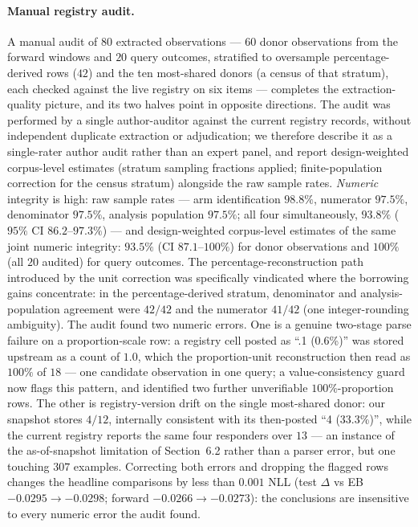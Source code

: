 \documentclass[11pt]{article}
\begin{document}
\paragraph{Manual registry audit.} A manual audit of $80$ extracted
observations --- $60$ donor observations from the forward windows and $20$
query outcomes, stratified to oversample percentage-derived rows ($42$) and
the ten most-shared donors (a census of that stratum), each checked against
the live registry on six
items --- completes the extraction-quality picture, and its two halves point
in opposite directions. The audit was performed by a single author-auditor
against the current registry records, without independent duplicate
extraction or adjudication; we therefore describe it as a single-rater
author audit rather than an expert panel, and report design-weighted
corpus-level estimates (stratum sampling fractions applied; finite-population
correction for the census stratum) alongside the raw sample rates.
\emph{Numeric} integrity is high: raw sample rates --- arm identification
$98.8\%$, numerator $97.5\%$, denominator $97.5\%$, analysis population
$97.5\%$; all four simultaneously, $93.8\%$ ($95\%$ CI $86.2$--$97.3\%$)
--- and design-weighted corpus-level estimates of the same joint numeric
integrity: $93.5\%$ (CI $87.1$--$100\%$) for donor observations and
$100\%$ (all $20$ audited) for query outcomes. The
percentage-reconstruction path introduced by the unit correction was
specifically vindicated where the borrowing gains concentrate: in the
percentage-derived stratum, denominator and analysis-population agreement
were $42/42$ and the numerator $41/42$ (one integer-rounding ambiguity). The
audit found two numeric errors. One is a genuine two-stage parse failure on a
proportion-scale row: a registry cell posted as ``.1 (0.6\%)'' was stored
upstream as a count of $1.0$, which the proportion-unit reconstruction then
read as $100\%$ of $18$ --- one candidate observation in one query; a
value-consistency guard now flags this pattern, and identified two further
unverifiable $100\%$-proportion rows. The other is registry-version drift on
the single most-shared donor: our snapshot stores $4/12$, internally
consistent with its then-posted ``4 (33.3\%)'', while the current registry
reports the same four responders over $13$ --- an instance of the
as-of-snapshot limitation of Section~6.2 rather than a parser error, but one
touching $307$ examples. Correcting both errors and dropping the flagged
rows changes the headline comparisons by less than $0.001$ NLL (test
$\Delta$ vs EB $-0.0295 \to -0.0298$; forward $-0.0266 \to -0.0273$): the
conclusions are insensitive to every numeric error the audit found.
\end{document}

